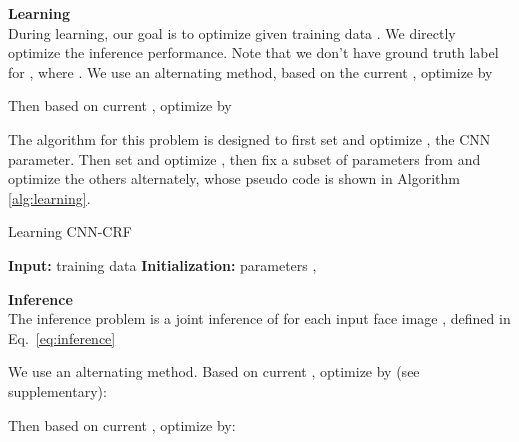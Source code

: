 \documentclass{article}
\begin{document}
\textbf{Learning}\\ During learning, our goal is to optimize  given training data . We directly optimize the inference performance. Note that we don't have ground truth label for ,
where . 
We use an alternating method,
based on the current , optimize  by


Then based on current , optimize  by 
\begingroup
\small 

\endgroup
The algorithm for this problem is designed to first set  and optimize , the CNN parameter. Then set  and optimize , then fix a subset of parameters from  and optimize the others alternately, whose pseudo code is shown in Algorithm \ref{alg:learning}.




















\begin{algorithm}[H]
\label{alg:learning}
\SetAlgoLined
\caption{Learning CNN-CRF}
\textbf{Input:} training data \;
 \textbf{Initialization:} parameters  \; 
, \;
\end{algorithm}



\textbf{Inference} \\
The inference problem is a joint inference of  for each input face image , defined in Eq.~\eqref{eq:inference}

We use an alternating method.
Based on current , optimize  by (see supplementary):

Then based on current , optimize  by:
\end{document}
